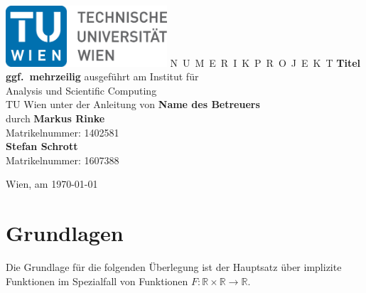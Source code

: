 \documentclass[a4paper,11pt,bibliography=totoc,listof=totoc,headinclude=true,cleardoublepage=empty,oneside]{scrartcl}
\newcommand{\R}{\mathbb{R}}
\begin{document}


\begin{titlepage}
  \begin{center}
    \includegraphics[width=0.45\textwidth]{TULogo.eps}
    \vskip 1cm%
    {\LARGE N~\Large U~M~E~R~I~K~P~R~O~J~E~K~T}
    \vskip 8mm
    {\huge\bfseries\color{change}Titel \\[1ex] ggf.\ mehrzeilig}
    \vskip 1cm
    \large 
    ausgef\"uhrt am    
    \vskip 0.75cm
    {\Large Institut f\"ur\\[1ex] Analysis und Scientific Computing}\\[1ex]
    {\Large TU Wien}
    \vskip0.75cm
    unter der Anleitung von
    \vskip0.75cm
    {\Large\bfseries\color{change}Name des Betreuers}\\[1ex]
    \vskip 0.5cm
    durch
    \vskip 0.5cm
    {\color{change} \Large\bfseries Markus Rinke }\\[1ex]
    Matrikelnummer: { \color{change} 1402581}\\[1ex]
    {\Large\bfseries Stefan Schrott}\\[1ex]
    Matrikelnummer: {1607388}\\[1ex]
   
  \end{center}
  
  \vfill
  
  \small
  Wien, am \today
  \vspace*{-15mm}
\end{titlepage}

\cleardoublepage



\tableofcontents

\cleardoublepage
{} 


\section{Grundlagen}
Die Grundlage für die folgenden Überlegung ist der Hauptsatz über implizite Funktionen im Spezialfall von Funktionen $F: \R \times \R \to \R$. 
\end{document}
